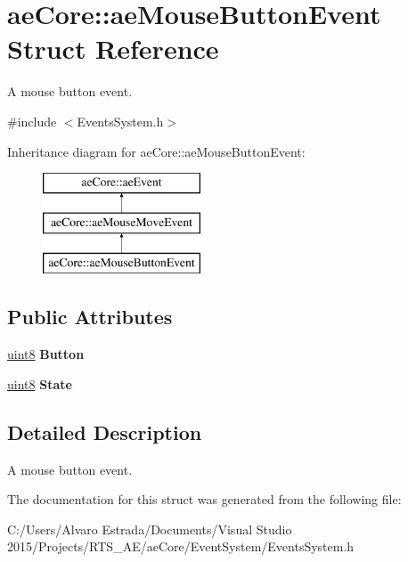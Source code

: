 \hypertarget{structae_core_1_1ae_mouse_button_event}{}\section{ae\+Core\+:\+:ae\+Mouse\+Button\+Event Struct Reference}
\label{structae_core_1_1ae_mouse_button_event}


A mouse button event.  




{\ttfamily \#include $<$Events\+System.\+h$>$}

Inheritance diagram for ae\+Core\+:\+:ae\+Mouse\+Button\+Event\+:\begin{figure}[H]
\begin{center}
\leavevmode
\includegraphics[height=3.000000cm]{structae_core_1_1ae_mouse_button_event}
\end{center}
\end{figure}
\subsection*{Public Attributes}
\begin{DoxyCompactItemize}
\item 
\hyperlink{namespaceae_core_aa13093dc911869e5b24942552898f01f}{uint8} {\bfseries Button}\hypertarget{structae_core_1_1ae_mouse_button_event_a7174e0c8635d450c50e8271f9fcd5817}{}\label{structae_core_1_1ae_mouse_button_event_a7174e0c8635d450c50e8271f9fcd5817}

\item 
\hyperlink{namespaceae_core_aa13093dc911869e5b24942552898f01f}{uint8} {\bfseries State}\hypertarget{structae_core_1_1ae_mouse_button_event_a9c0ab87529ea05ece571c2bf9fe7e05b}{}\label{structae_core_1_1ae_mouse_button_event_a9c0ab87529ea05ece571c2bf9fe7e05b}

\end{DoxyCompactItemize}


\subsection{Detailed Description}
A mouse button event. 

The documentation for this struct was generated from the following file\+:\begin{DoxyCompactItemize}
\item 
C\+:/\+Users/\+Alvaro Estrada/\+Documents/\+Visual Studio 2015/\+Projects/\+R\+T\+S\+\_\+\+A\+E/ae\+Core/\+Event\+System/Events\+System.\+h\end{DoxyCompactItemize}
